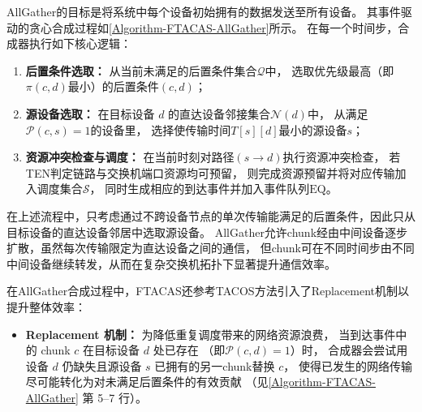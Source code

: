 AllGather的目标是将系统中每个设备初始拥有的数据发送至所有设备。
其事件驱动的贪心合成过程如\autoref{Algorithm-FTACAS-AllGather}所示。
在每一个时间步，合成器执行如下核心逻辑：
\begin{enumerate}[label=(\arabic*)]
    \item \textbf{后置条件选取：}
    从当前未满足的后置条件集合$\mathcal{Q}$中，
    选取优先级最高（即$\pi(c,d)$最小）的后置条件$(c,d)$；

    \item \textbf{源设备选取：}
    在目标设备 $d$ 的直达设备邻接集合$\mathcal{N}(d)$中，
    从满足$\mathcal{P}(c,s)=1$的设备里，
    选择使传输时间$T[s][d]$最小的源设备$s$；

    \item \textbf{资源冲突检查与调度：}
    在当前时刻对路径$(s\rightarrow d)$执行资源冲突检查，
    若TEN判定链路与交换机端口资源均可预留，
    则完成资源预留并将对应传输加入调度集合$\mathcal{S}$，
    同时生成相应的到达事件并加入事件队列$\mathrm{EQ}$。
\end{enumerate}

在上述流程中，只考虑通过不跨设备节点的单次传输能满足的后置条件，因此只从目标设备的直达设备邻居中选取源设备。
AllGather允许chunk经由中间设备逐步扩散，虽然每次传输限定为直达设备之间的通信，
但chunk可在不同时间步由不同中间设备继续转发，从而在复杂交换机拓扑下显著提升通信效率。

在AllGather合成过程中，FTACAS还参考TACOS方法引入了Replacement机制以提升整体效率：
\begin{itemize}
    \item \textbf{Replacement 机制：}
    为降低重复调度带来的网络资源浪费，
    当到达事件中的 chunk $c$ 在目标设备 $d$ 处已存在
    （即$\mathcal{P}(c,d)=1$）时，
    合成器会尝试用设备 $d$ 仍缺失且源设备 $s$ 已拥有的另一chunk替换 $c$，
    使得已发生的网络传输尽可能转化为对未满足后置条件的有效贡献
    （见\autoref{Algorithm-FTACAS-AllGather} 第 5--7 行）。
\end{itemize}


